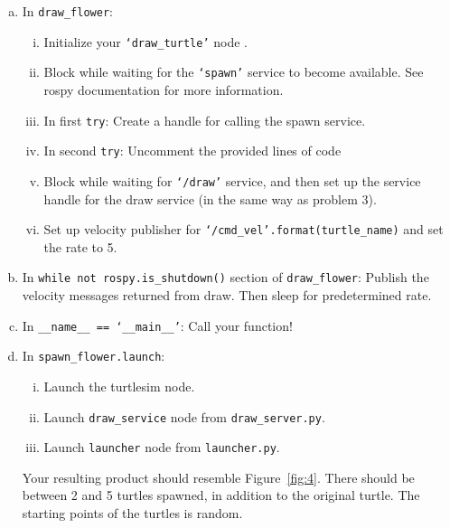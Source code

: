 \begin{enumerate}[(a)]
  \item In \texttt{draw\_flower}:
  \begin{enumerate}[i.]
    \item Initialize your \texttt{`draw\_turtle'} node
    .
    \item Block while waiting for the \texttt{`spawn'} service to become available. See rospy
    documentation for more information.

    \item In first \texttt{try}: Create a handle for calling the spawn service.
    \item In second \texttt{try}: Uncomment the provided lines of code
    \item Block while waiting for \texttt{`/draw'} service, and then set up the service handle for
    the draw service (in the same way as problem 3). %

    \item Set up velocity publisher for \texttt{`{}/cmd\_vel'.format(turtle\_name)} and set the rate to 5.
  \end{enumerate}
  
  
  
  \item In \texttt{while not rospy.is\_shutdown()} section of \texttt{draw\_flower}: Publish the
  velocity messages returned from draw. Then sleep for predetermined rate.

  \item In \texttt{\_\_name\_\_ == `\_\_main\_\_'}: Call your function!
  \item In \texttt{spawn\_flower.launch}:
  \begin{enumerate}[i.]
    \item Launch the turtlesim node.
    \item Launch \texttt{draw\_service} node from \texttt{draw\_server.py}.
    \item  Launch \texttt{launcher} node from \texttt{launcher.py}.
  \end{enumerate}

  Your resulting product should resemble Figure~\ref{fig:4}. There should be between 2 and 5 turtles
  spawned, in addition to the original turtle. The starting points of the turtles is random.


\end{enumerate}

